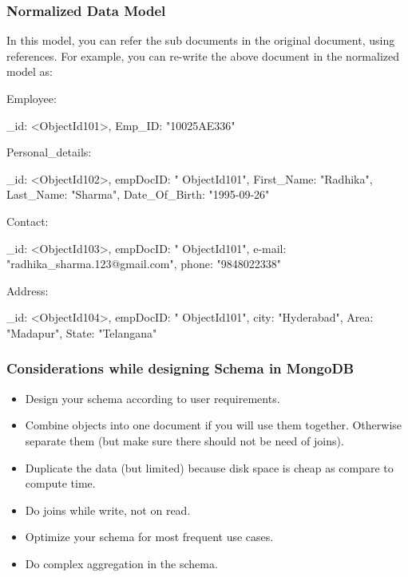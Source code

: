 \documentclass[12pt]{article}
\begin{document}
\subsubsection{Normalized Data Model}

In this model, you can refer the sub documents in the original document,
using references. For example, you can re-write the above document in
the normalized model as:

Employee:

\begin{javascriptcode}
{
    _id: <ObjectId101>,
    Emp_ID: "10025AE336"
}
\end{javascriptcode}

Personal\_details:

\begin{javascriptcode}
{
    _id: <ObjectId102>,
    empDocID: " ObjectId101",
    First_Name: "Radhika",
    Last_Name: "Sharma",
    Date_Of_Birth: "1995-09-26"
}
\end{javascriptcode}

Contact:

\begin{javascriptcode}
{
    _id: <ObjectId103>,
    empDocID: " ObjectId101",
    e-mail: "radhika_sharma.123@gmail.com",
    phone: "9848022338"
}
\end{javascriptcode}

Address:

\begin{javascriptcode}
{
    _id: <ObjectId104>,
    empDocID: " ObjectId101",
    city: "Hyderabad",
    Area: "Madapur",
    State: "Telangana"
}
\end{javascriptcode}

\subsubsection{Considerations while designing Schema in MongoDB}

\begin{itemize}
  \item Design your schema according to user requirements.

  \item Combine objects into one document if you will use them together.
    Otherwise separate them (but make sure there should not be need of
    joins).

  \item Duplicate the data (but limited) because disk space is cheap as compare to compute time.
  \item Do joins while write, not on read.
  \item Optimize your schema for most frequent use cases.
  \item Do complex aggregation in the schema.
\end{itemize}
\end{document}
